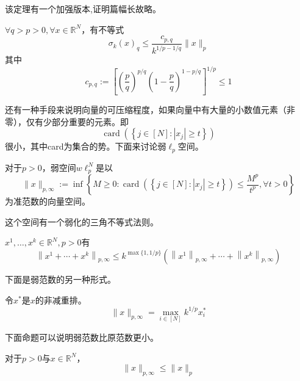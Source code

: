 该定理有一个加强版本,证明篇幅长故略。
\begin{theorem}
    $\forall q>p>0,\forall x\in \mathbb{R}^N$，有不等式
    \begin{equation}
        \sigma_k(x)_q \leq \frac{c_{p,q}}{k^{1 / p-1 / q}}\|x\|_p
    \end{equation}
    其中
    \begin{equation}
        c_{p,q}:=\left[\left(\frac{p}{q}\right)^{p / q}\left(1-\frac{p}{q}\right)^{1-p / q}\right]^{1 / p} \leq 1
    \end{equation}
\end{theorem}
还有一种手段来说明向量的可压缩程度，如果向量中有大量的小数值元素（非零），仅有少部分重要的元素。即
\begin{equation*}
    \operatorname{card}\left(\left\{j \in[N]:\left|x_j\right| \geq t\right\}\right)
\end{equation*}
很小，其中card为集合的势。下面来讨论弱$\ell_p$空间。
\begin{definition}
    对于$p>0$，弱空间$w \ell_p^N$是以
    \begin{equation}
        \|x\|_{p,\infty}:=\inf \left\{M \geq 0: \operatorname{card}\left(\left\{j \in[N]:\left|x_j\right| \geq t\right\}\right) \leq \frac{M^p}{t^p} ,\forall t>0\right\}
    \end{equation}
    为准范数的向量空间。
\end{definition}
这个空间有一个弱化的三角不等式法则。
\begin{proposition}
    $x^1,\ldots,x^k \in \mathbb{R}^N,p>0$有
    \begin{equation}
        \left\|x^1+\cdots+x^k\right\|_{p,\infty} \leq k^{\max \{1,1 / p\}}\left(\left\|x^1\right\|_{p,\infty}+\cdots+\left\|x^k\right\|_{p,\infty}\right)
    \end{equation}
\end{proposition}
下面是弱范数的另一种形式。
\begin{proposition}
令$x^*$是$x$的非减重排。
    \begin{equation}
        \|x\|_{p,\infty}=\max _{i \in[N]} k^{1 / p} x_i^*
    \end{equation}
\end{proposition}
下面命题可以说明弱范数比原范数更小。
\begin{proposition}
    对于$p>0$与$x\in \mathbb{R}^N$，
    \begin{equation}
        \|x\|_{p,\infty} \leq\|x\|_p
    \end{equation}
\end{proposition}
